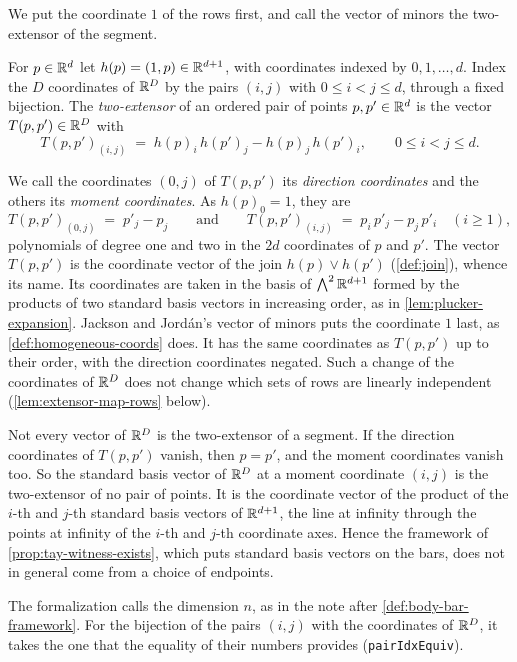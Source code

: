 We put the coordinate $1$ of the rows first, and call the vector of
minors the two-extensor of the segment.

\begin{definition}
  \label{def:two-extensor}
  \leanok
  For $p \in {\mathbb{R}}^d$ let $h(p) = (1, p) \in {\mathbb{R}}^{d+1}$, with coordinates
  indexed by $0, 1, \dots, d$. Index the $D$ coordinates of ${\mathbb{R}}^D$ by
  the pairs $(i, j)$ with $0 \le i < j \le d$, through a fixed
  bijection. The \emph{two-extensor} of an ordered pair of points
  $p, p' \in {\mathbb{R}}^d$ is the vector $T(p, p') \in {\mathbb{R}}^D$ with
  \[
    T(p, p')_{(i,j)} \;=\; h(p)_i\, h(p')_j - h(p)_j\, h(p')_i,
    \qquad 0 \le i < j \le d.
  \]
\end{definition}

We call the coordinates $(0, j)$ of $T(p, p')$ its \emph{direction
coordinates} and the others its \emph{moment coordinates}. As
$h(p)_0 = 1$, they are
\[
  T(p, p')_{(0,j)} \;=\; p'_j - p_j
  \qquad\text{and}\qquad
  T(p, p')_{(i,j)} \;=\; p_i\, p'_j - p_j\, p'_i \quad (i \ge 1),
\]
polynomials of degree one and two in the $2d$ coordinates of $p$ and
$p'$. The vector $T(p, p')$ is the coordinate vector of the join
$h(p) \vee h(p')$ (\cref{def:join}), whence its name. Its coordinates
are taken in the basis of $\bigwedge^2 {\mathbb{R}}^{d+1}$ formed by the products
of two standard basis vectors in increasing order, as in
\cref{lem:plucker-expansion}. Jackson and Jord\'an's vector of
minors puts the coordinate $1$ last, as \cref{def:homogeneous-coords}
does. It has the same coordinates as $T(p, p')$ up to their order,
with the direction coordinates negated. Such a change of the
coordinates of ${\mathbb{R}}^D$ does not change which sets of rows are linearly
independent (\cref{lem:extensor-map-rows} below).

Not every vector of ${\mathbb{R}}^D$ is the two-extensor of a segment. If the
direction coordinates of $T(p, p')$ vanish, then $p = p'$, and the
moment coordinates vanish too. So the standard basis vector of ${\mathbb{R}}^D$
at a moment coordinate $(i, j)$ is the two-extensor of no pair of
points. It is the coordinate vector of the product of the $i$-th and
$j$-th standard basis vectors of ${\mathbb{R}}^{d+1}$, the line at infinity
through the points at infinity of the $i$-th and $j$-th coordinate
axes. Hence the framework of \cref{prop:tay-witness-exists}, which
puts standard basis vectors on the bars, does not in general come
from a choice of endpoints.

\begin{fmlnote}
  The formalization calls the dimension $n$, as in the note after
  \cref{def:body-bar-framework}. For the bijection of the pairs
  $(i, j)$ with the coordinates of ${\mathbb{R}}^D$, it takes the one that the
  equality of their numbers provides
  (\texttt{pairIdxEquiv}).
\end{fmlnote}

